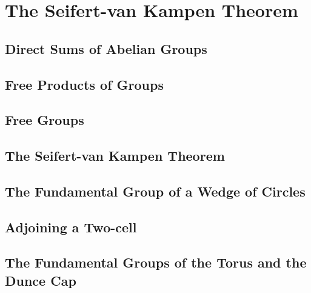 \chapter{The Seifert-van Kampen Theorem}

\section{Direct Sums of Abelian Groups}

\section{Free Products of Groups}

\section{Free Groups}

\section{The Seifert-van Kampen Theorem}

\section{The Fundamental Group of a Wedge of Circles}

\section{Adjoining a Two-cell}

\section{The Fundamental Groups of the Torus and the Dunce Cap}
